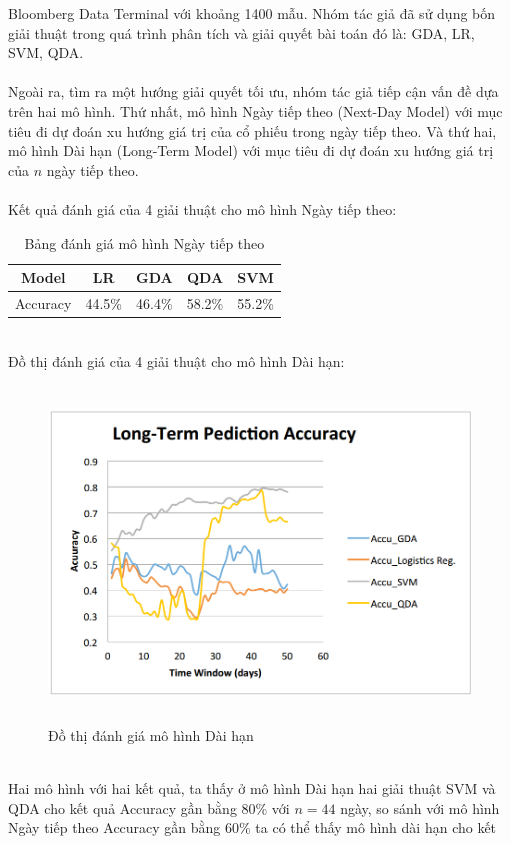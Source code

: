 Bloomberg Data Terminal với khoảng 1400 mẫu. Nhóm tác giả đã sử dụng bốn 
giải thuật trong quá trình phân tích và giải quyết bài toán đó là: GDA, LR, SVM, 
QDA.\\\\
Ngoài ra, tìm ra một hướng giải quyết tối ưu, nhóm tác giả tiếp cận vấn đề dựa 
trên hai mô hình. Thứ nhất, mô hình Ngày tiếp theo (Next-Day Model) với mục 
tiêu đi dự đoán xu hướng giá trị của cổ phiếu trong ngày tiếp theo. Và thứ hai, 
mô hình Dài hạn (Long-Term Model) với mục tiêu đi dự đoán xu hướng giá trị của 
$n$ ngày tiếp theo.\\\\
Kết quả đánh giá của 4 giải thuật cho mô hình Ngày tiếp theo:
\begin{table}[h]
\centering
\begin{tabular}{ |c|c|c|c|c| }
\hline
Model & LR & GDA & QDA & SVM \\
\hline
Accuracy & 44.5\% & 46.4\% & 58.2\% & 55.2\% \\
\hline
\end{tabular}
\caption{Bảng đánh giá mô hình Ngày tiếp theo }
\end{table}\\
Đồ thị đánh giá của 4 giải thuật cho mô hình Dài hạn:
\begin{figure}[h!]
\centering
\includegraphics[height=3.5in, keepaspectratio=true]{longtermmodel.png}
\caption{Đồ thị đánh giá mô hình Dài hạn}
\end{figure}\\
Hai mô hình với hai kết quả, ta thấy ở mô hình Dài hạn hai giải thuật SVM và 
QDA cho kết quả Accuracy gần bằng 80\% với $n=44$ ngày, so sánh với mô hình 
Ngày tiếp theo Accuracy gần bằng 60\% ta có thể thấy mô hình dài hạn cho kết 
